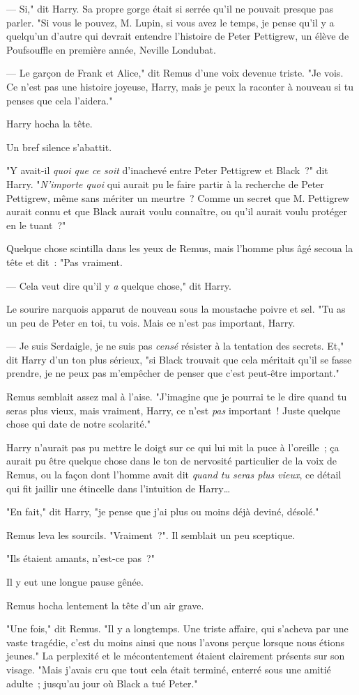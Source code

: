 --- Si," dit Harry. Sa propre gorge était si serrée qu'il ne pouvait presque pas parler. "Si vous le pouvez, M. Lupin, si vous avez le temps, je pense qu'il y a quelqu'un d'autre qui devrait entendre l'histoire de Peter Pettigrew, un élève de Poufsouffle en première année, Neville Londubat.

--- Le garçon de Frank et Alice," dit Remus d'une voix devenue triste. "Je vois. Ce n'est pas une histoire joyeuse, Harry, mais je peux la raconter à nouveau si tu penses que cela l'aidera."

Harry hocha la tête.

Un bref silence s'abattit.

"Y avait-il \emph{quoi que ce soit} d'inachevé entre Peter Pettigrew et Black~?" dit Harry. "\emph{N'importe quoi} qui aurait pu le faire partir à la recherche de Peter Pettigrew, même sans mériter un meurtre~? Comme un secret que M. Pettigrew aurait connu et que Black aurait voulu connaître, ou qu'il aurait voulu protéger en le tuant~?"

Quelque chose scintilla dans les yeux de Remus, mais l'homme plus âgé secoua la tête et dit~: "Pas vraiment.

--- Cela veut dire qu'il y \emph{a} quelque chose," dit Harry.

Le sourire narquois apparut de nouveau sous la moustache poivre et sel. "Tu as un peu de Peter en toi, tu vois. Mais ce n'est pas important, Harry.

--- Je suis Serdaigle, je ne suis pas \emph{censé} résister à la tentation des secrets. Et," dit Harry d'un ton plus sérieux, "si Black trouvait que cela méritait qu'il se fasse prendre, je ne peux pas m'empêcher de penser que c'est peut-être important."

Remus semblait assez mal à l'aise. "J'imagine que je pourrai te le dire quand tu seras plus vieux, mais vraiment, Harry, ce n'est \emph{pas} important~! Juste quelque chose qui date de notre scolarité."

Harry n'aurait pas pu mettre le doigt sur ce qui lui mit la puce à l'oreille~; ça aurait pu être quelque chose dans le ton de nervosité particulier de la voix de Remus, ou la façon dont l'homme avait dit \emph{quand tu seras plus vieux}, ce détail qui fit jaillir une étincelle dans l'intuition de Harry…

"En fait," dit Harry, "je pense que j'ai plus ou moins déjà deviné, désolé."

Remus leva les sourcils. "Vraiment~?". Il semblait un peu sceptique.

"Ils étaient amants, n'est-ce pas~?"

Il y eut une longue pause gênée.

Remus hocha lentement la tête d'un air grave.

"Une fois," dit Remus. "Il y a longtemps. Une triste affaire, qui s'acheva par une vaste tragédie, c'est du moins ainsi que nous l'avons perçue lorsque nous étions jeunes." La perplexité et le mécontentement étaient clairement présents sur son visage. "Mais j'avais cru que tout cela était terminé, enterré sous une amitié adulte~; jusqu'au jour où Black a tué Peter." 

